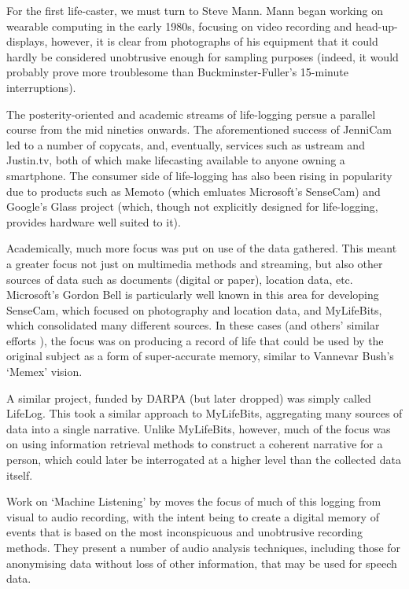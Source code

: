 For the first life-caster, we must turn to Steve Mann.  Mann began working on wearable computing in the early 1980s, focusing on video recording and head-up-displays, however, it is clear from photographs of his equipment that it could hardly be considered unobtrusive enough for sampling purposes (indeed, it would probably prove more troublesome than Buckminster-Fuller's 15-minute interruptions).

The posterity-oriented and academic streams of life-logging persue a parallel course from the mid nineties onwards.  The aforementioned success of JenniCam led to a number of copycats, and, eventually, services such as ustream and Justin.tv, both of which make lifecasting available to anyone owning a smartphone.  The consumer side of life-logging has also been rising in popularity due to products such as Memoto (which emluates Microsoft's SenseCam) and Google's Glass project (which, though not explicitly designed for life-logging, provides hardware well suited to it).

Academically, much more focus was put on use of the data gathered.  This meant a greater focus not just on multimedia methods and streaming, but also other sources of data such as documents (digital or paper), location data, etc.  Microsoft's Gordon Bell is particularly well known in this area for developing SenseCam, which focused on photography and location data, and MyLifeBits\cite{gemmell2002mylifebits,gemmell2006mylifebits}, which consolidated many different sources.  In these cases (and others' similar efforts \cite{huynh2002haystack,dumais2003stuff,dittrich2006imemex}), the focus was on producing a record of life that could be used by the original subject as a form of super-accurate memory, similar to Vannevar Bush's `Memex' vision\cite{bush1945we}.

A similar project, funded by DARPA (but later dropped) was simply called LifeLog.  This took a similar approach to MyLifeBits, aggregating many sources of data into a single narrative.  Unlike MyLifeBits, however, much of the focus was on using information retrieval methods to construct a coherent narrative for a person, which could later be interrogated at a higher level than the collected data itself.

Work on `Machine Listening' by \cite{malkin2006machine} moves the focus of much of this logging from visual to audio recording, with the intent being to create a digital memory of events that is based on the most inconspicuous and unobtrusive recording methods.  They present a number of audio analysis techniques, including those for anonymising data without loss of other information, that may be used for speech data.

